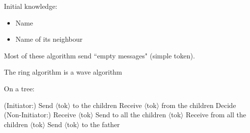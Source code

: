 \documentclass{article}
\newcommand\tok[1]{$\langle$#1$\rangle$}
\begin{document}
Initial knowledge:
\begin{itemize}
\item Name
\item Name of its neighbour
\end{itemize}

Most of these algorithm send ``empty messages" (simple token).
\bigskip

The ring algorithm is a wave algorithm

On a tree:

\begin{algorithm}[h]
\Label(Initiator:){
	Send \tok{tok} to the children\;
	Receive \tok{tok} from the children\;
	Decide\;
}
\Label(Non-Initiator:){
	Receive \tok{tok}\;
	Send to all the children \tok{tok}\;
	Receive from all the children \tok{tok}\;
	Send \tok{tok} to the father\;
}


\end{algorithm}
\end{document}
